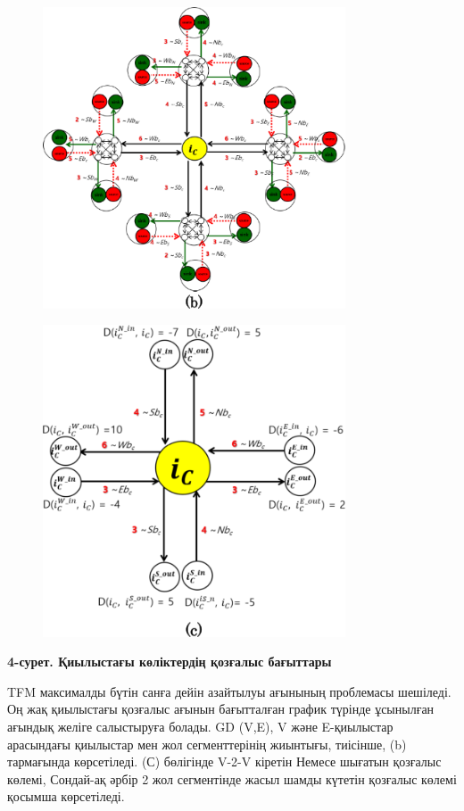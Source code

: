 \begin{figure}[H]
	\centering
	\includegraphics[width=0.8\textwidth]{assets/166}
	\caption*{}
\end{figure}

\begin{figure}[H]
	\centering
	\includegraphics[width=0.8\textwidth]{assets/167}
	\caption*{}
\end{figure}

{\bfseries 4-сурет. Қиылыстағы көліктердің қозғалыс бағыттары}

TFM максималды бүтін санға дейін азайтылуы ағынының проблемасы шешіледі.
Оң жақ қиылыстағы қозғалыс ағынын бағытталған график түрінде ұсынылған
ағындық желіге салыстыруға болады. GD (V,E), V және E-қиылыстар
арасындағы қиылыстар мен жол сегменттерінің жиынтығы, тиісінше, (b)
тармағында көрсетіледі. (С) бөлігінде V-2-V кіретін Немесе шығатын
қозғалыс көлемі, Сондай-ақ әрбір 2 жол сегментінде жасыл шамды күтетін
қозғалыс көлемі қосымша көрсетіледі.

